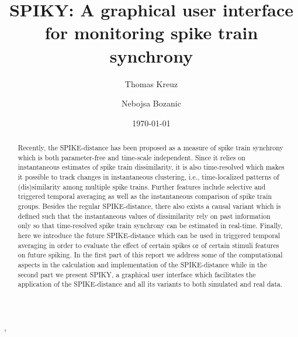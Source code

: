 \documentclass[10pt,twocolumn]{elsart5p}
\begin{document}
\begin{frontmatter}

\title{SPIKY: A graphical user interface for monitoring spike train synchrony}

\author{Thomas Kreuz},
\author{Nebojsa Bozanic}

\address{Institute for complex systems, CNR, Sesto Fiorentino, Italy}


\date{\today}

\begin{abstract}
    Recently, the SPIKE-distance has been proposed as a measure of spike train synchrony which is both parameter-free and time-scale independent. Since it relies on instantaneous estimates of spike train dissimilarity, it is also time-resolved which makes it possible to track changes in instantaneous clustering, i.e., time-localized patterns of (dis)similarity among multiple spike trains. Further features include selective and triggered temporal averaging as well as the instantaneous comparison of spike train groups. Besides the regular SPIKE-distance, there also exists a causal variant which is defined such that the instantaneous values of dissimilarity rely on past information only so that time-resolved spike train synchrony can be estimated in real-time. Finally, here we introduce the future SPIKE-distance which can be used in triggered temporal averaging in order to evaluate the effect of certain spikes or of certain stimuli features on future spiking. In the first part of this report we address some of the computational aspects in the calculation and implementation of the SPIKE-distance while in the second part we present SPIKY, a graphical user interface which facilitates the application of the SPIKE-distance and all its variants to both simulated and real data.
\end{abstract}



\end{frontmatter}
\end{document}
